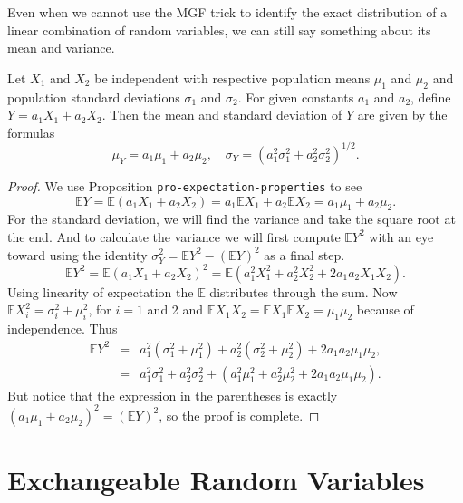 Even when we cannot use the MGF trick to identify the exact
distribution of a linear combination of random variables, we can still
say something about its mean and variance.

\begin{prop}
\label{pro-mean-sd-lin-comb-two} Let \(X_{1}\) and \(X_{2}\) be
independent with respective population means \(\mu_{1}\) and
\(\mu_{2}\) and population standard deviations \(\sigma_{1}\) and
\(\sigma_{2}\). For given constants \(a_{1}\) and \(a_{2}\), define
\(Y=a_{1}X_{1}+a_{2}X_{2}\). Then the mean and standard deviation of
\(Y\) are given by the formulas
\begin{equation}
\mu_{Y}=a_{1}\mu_{1}+a_{2}\mu_{2},\quad \sigma_{Y}=\left(a_{1}^{2}\sigma_{1}^{2}+a_{2}^{2}\sigma_{2}^{2}\right)^{1/2}.
\end{equation}
\end{prop}

\begin{proof}
We use Proposition \texttt{pro-expectation-properties} to see \[ \mathbb{E}
Y=\mathbb{E}\left(a_{1}X_{1}+a_{2}X_{2}\right)=a_{1}\mathbb{E}
X_{1}+a_{2}\mathbb{E} X_{2}=a_{1}\mu_{1}+a_{2}\mu_{2}.  \] For the
standard deviation, we will find the variance and take the square root
at the end. And to calculate the variance we will first compute
\(\mathbb{E} Y^{2}\) with an eye toward using the identity
\(\sigma_{Y}^{2}=\mathbb{E} Y^{2}-\left(\mathbb{E} Y\right)^{2}\) as a
final step.  \[ \mathbb{E}
Y^{2}=\mathbb{E}\left(a_{1}X_{1}+a_{2}X_{2}\right)^{2}=\mathbb{E}\left(a_{1}^{2}X_{1}^{2}+a_{2}^{2}X_{2}^{2}+2a_{1}a_{2}X_{1}X_{2}\right).
\] Using linearity of expectation the \(\mathbb{E}\) distributes
through the sum. Now \(\mathbb{E}
X_{i}^{2}=\sigma_{i}^{2}+\mu_{i}^{2}\), for \(i=1\) and 2 and
\(\mathbb{E} X_{1}X_{2}=\mathbb{E} X_{1}\mathbb{E}
X_{2}=\mu_{1}\mu_{2}\) because of independence. Thus
\begin{eqnarray*}
\mathbb{E} Y^{2} & = & a_{1}^{2}(\sigma_{1}^{2}+\mu_{1}^{2})+a_{2}^{2}(\sigma_{2}^{2}+\mu_{2}^{2})+2a_{1}a_{2}\mu_{1}\mu_{2},\\
 & = & a_{1}^{2}\sigma_{1}^{2}+a_{2}^{2}\sigma_{2}^{2}+\left(a_{1}^{2}\mu_{1}^{2}+a_{2}^{2}\mu_{2}^{2}+2a_{1}a_{2}\mu_{1}\mu_{2}\right).
\end{eqnarray*}
But notice that the expression in the parentheses is exactly
\(\left(a_{1}\mu_{1}+a_{2}\mu_{2}\right)^{2}=\left(\mathbb{E}
Y\right)^{2}\), so the proof is complete.
\end{proof}

\section{Exchangeable Random Variables}
\label{sec-7-5}

